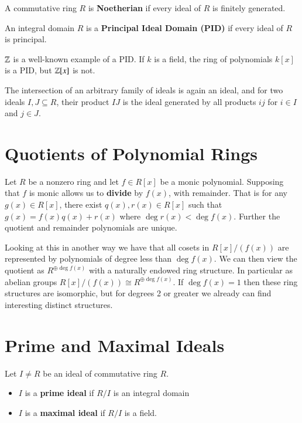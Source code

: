 \documentclass[12pt, a4paper, oneside, openright, titlepage]{book}
\begin{document}
\begin{defn}
    A commutative ring $R$ is \textbf{Noetherian} if every ideal of $R$ is finitely generated.
\end{defn}

\begin{defn}
    An integral domain $R$ is a \textbf{Principal Ideal Domain (PID)} if every ideal of $R$ is principal.
\end{defn}

$\mathbb Z$ is a well-known example of a PID. If $k$ is a field, the ring of polynomials $k[x]$ is a PID, but $\mathbb Z[x]$ is not.

The intersection of an arbitrary family of ideals is again an ideal, and for two ideals $I,J \subseteq R$, their product $IJ$ is the ideal generated by all products $ij$ for $i \in I$ and $j \in J$.


\section{Quotients of Polynomial Rings}

Let $R$ be a nonzero ring and let $f \in R[x]$ be a monic polynomial. Supposing that $f$ is monic allows us to \textbf{divide} by $f(x)$, with remainder. That is for any $g(x) \in R[x]$, there exist $q(x), r(x) \in R[x]$ such that $g(x) = f(x)q(x) + r(x)$ where $\deg r(x) < \deg f(x)$. Further the quotient and remainder polynomials are unique.

Looking at this in another way we have that all cosets in $R[x]/(f(x))$ are represented by polynomials of degree less than $\deg f(x)$. We can then view the quotient as $R^{\oplus \deg f(x)}$ with a naturally endowed ring structure. In particular as abelian groups $R[x]/(f(x)) \cong R^{\oplus \deg f(x)}$. If $\deg f(x) = 1$ then these ring structures are isomorphic, but for degrees 2 or greater we already can find interesting distinct structures.


\section{Prime and Maximal Ideals}

\begin{defn}
    Let $I \neq R$ be an ideal of commutative ring $R$. \begin{itemize}
        \item $I$ is a \textbf{prime ideal} if $R/I$ is an integral domain
        \item $I$ is a \textbf{maximal ideal} if $R/I$ is a field.
    \end{itemize}
\end{defn}
\end{document}
